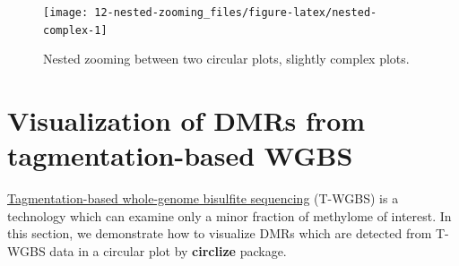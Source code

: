 \documentclass[]{book}
\newenvironment{Shaded}{\begin{snugshade}}{\end{snugshade}}
\newcommand{\KeywordTok}[1]{\textcolor[rgb]{0.13,0.29,0.53}{\textbf{#1}}}
\newcommand{\DataTypeTok}[1]{\textcolor[rgb]{0.13,0.29,0.53}{#1}}
\newcommand{\DecValTok}[1]{\textcolor[rgb]{0.00,0.00,0.81}{#1}}
\newcommand{\FloatTok}[1]{\textcolor[rgb]{0.00,0.00,0.81}{#1}}
\newcommand{\StringTok}[1]{\textcolor[rgb]{0.31,0.60,0.02}{#1}}
\newcommand{\ControlFlowTok}[1]{\textcolor[rgb]{0.13,0.29,0.53}{\textbf{#1}}}
\newcommand{\OperatorTok}[1]{\textcolor[rgb]{0.81,0.36,0.00}{\textbf{#1}}}
\newcommand{\NormalTok}[1]{#1}
\theoremstyle{definition}
\theoremstyle{definition}
\theoremstyle{remark}
\begin{document}
\begin{Shaded}
\end{Shaded}

\begin{figure}

{\centering \texttt{[image: 12-nested-zooming\_files/figure-latex/nested-complex-1]} 

}

\caption{Nested zooming between two circular plots, slightly complex plots.}\label{fig:nested-complex}
\end{figure}

\section{Visualization of DMRs from tagmentation-based
WGBS}\label{visualization-of-dmrs-from-tagmentation-based-wgbs}

\href{http://www.nature.com/nprot/journal/v8/n10/full/nprot.2013.118.html}{Tagmentation-based
whole-genome bisulfite sequencing} (T-WGBS) is a technology which can
examine only a minor fraction of methylome of interest. In this section,
we demonstrate how to visualize DMRs which are detected from T-WGBS data
in a circular plot by \textbf{circlize} package.
\end{document}
